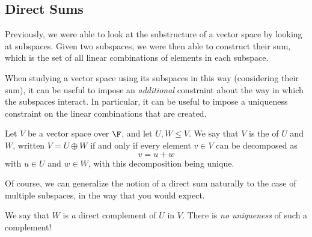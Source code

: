 \subsection{Direct Sums}

Previously, we were able to look at the substructure of a vector space by looking at subspaces. Given two subspaces, we were then able to construct their sum, which is the set of all linear combinations of elements in each subspace. 

When studying a vector space using its subspaces in this way (considering their sum), it can be useful to impose an \emph{additional} constraint about the way in which the subspaces interact. In particular, it can be useful to impose a uniqueness constraint on the linear combinations that are created.

\begin{definition}
    Let $V$ be a vector space over $\F$, and let $U, W \leq V$. We say that $V$ is the  of $U$ and $W$, written $V = U \oplus W$ if and only if every element $v \in V$ can be decomposed as
    $$
    v = u + w
    $$
    with $u \in U$ and $w \in W$, with this decomposition being unique.
\end{definition}

Of course, we can generalize the notion of a direct sum naturally to the case of multiple subspaces, in the way that you would expect.

\begin{remark}[Warning]
    We say that $W$ is \emph{a} direct complement of $U$ in $V$. There is \emph{no uniqueness} of such a complement!
\end{remark}



